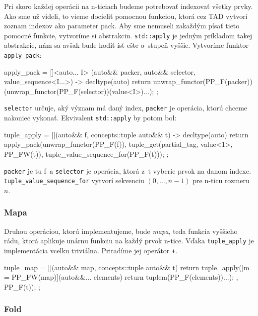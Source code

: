 Pri skoro každej operácii na n-ticiach budeme potrebovať indexovať všetky prvky. Ako sme už videli, to vieme docieliť pomocnou funkciou, ktorá cez TAD vytvorí zoznam indexov ako parameter pack. Aby sme nemuseli zakaždým písať tieto pomocné funkcie, vytvoríme si abstrakciu. \texttt{std::apply} je jedným príkladom takej abstrakcie, nám sa avšak bude hodiť ísť ešte o~stupeň vyššie. Vytvoríme funktor \texttt{apply\_pack}:
\begin{code}
apply_pack = []<auto... I>
             (auto&& packer, auto&& selector, value_sequence<I...>)
                 -> decltype(auto)
             { return unwrap_functor(PP_F(packer))
                      (unwrap_functor(PP_F(selector))(value<I>)...); };
\end{code}
\texttt{selector} určuje, aký význam má daný index, \texttt{packer} je operácia, ktorú chceme nakoniec vykonať. Ekvivalent \texttt{std::apply} by potom bol:
\begin{code}
tuple_apply =
    [](auto&& f, concepts::tuple auto&& t) -> decltype(auto)
    { return apply_pack(unwrap_functor(PP_F(f)),
                        tuple_get(partial_tag, value<1>, PP_FW(t)),
                        tuple_value_sequence_for(PP_F(t))); };
\end{code}
\texttt{packer} je tu f~a \texttt{selector} je operácia, ktorá z~t vyberie prvok na danom indexe. \texttt{tuple\_value\_sequence\_for} vytvorí sekvenciu $(0, \ldots, n-1)$ pre n-ticu rozmeru $n$.

\subsubsection{Mapa}

Druhou operáciou, ktorú implementujeme, bude \emph{mapa}, teda funkcia vyššieho rádu, ktorá aplikuje unárnu funkciu na každý prvok n-tice. Vďaka \texttt{tuple\_apply} je implementácia vcelku triviálna. Priradíme jej operátor \texttt{+}.
\begin{code}[fontsize=\footnotesize]
tuple_map = [](auto&& map, concepts::tuple auto&& t)
            { return tuple_apply([m = PP_FW(map)](auto&&... elements)
                                 { return tuple{m(PP_F(elements))}...); },
                                 PP_F(t)); };
\end{code}

\subsubsection{Fold}

